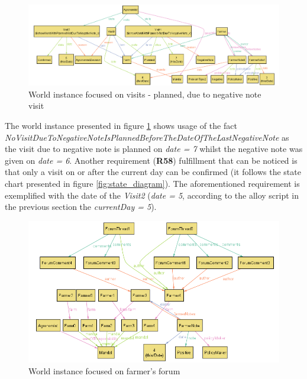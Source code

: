 \begin{figure}[H]
    \centering
    \includegraphics[width=\textwidth, keepaspectratio, origin=c]{alloy/world_instances/showWorldWithPlannedVisitDueToNegativeNote2.png}
    \caption{World instance focused on visits - planned, due to negative note visit}
    \label{fig:planned_negative_note}
\end{figure}

The world instance presented in figure \ref{fig:planned_negative_note} shows usage of the fact \textit{NoVisitDueToNegativeNoteIsPlannedBeforeTheDateOfTheLastNegativeNote} as the visit due to negative note is planned on \textit{date = 7} whilst the negative note was given on \textit{date = 6}. Another requirement (\textbf{R58}) fulfillment that can be noticed is that only a visit on or after the current day can be confirmed (it follows the state chart presented in figure \ref{fig:state_diagram}). The aforementioned requirement is exemplified with the date of the \textit{Visit2} (\textit{date = 5}, according to the alloy script in the previous section the \textit{currentDay = 5}).

\begin{figure}[H]
    \centering
    \includegraphics[width=\textwidth, keepaspectratio, origin=c]{alloy/world_instances/showWorldFocusedOnForum2.png}
    \caption{World instance focused on farmer's forum}
    \label{fig:forum}
\end{figure}

